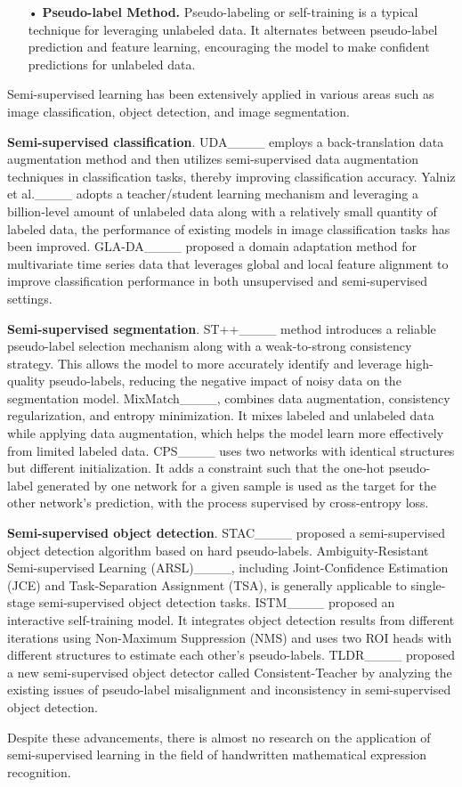 \begin{itemize}
    \item [•]
    \textbf{Pseudo-label Method.}
    Pseudo-labeling or self-training is a typical technique for leveraging unlabeled data. It alternates between pseudo-label prediction and feature learning, encouraging the model to make confident predictions for unlabeled data. 
\end{itemize}

Semi-supervised learning has been extensively applied in various areas such as image classification, object detection, and image segmentation.

\textbf{Semi-supervised classification}. 
UDA____ employs a back-translation data augmentation method and then utilizes semi-supervised data augmentation techniques in classification tasks, thereby improving classification accuracy. Yalniz et al.____ adopts a teacher/student learning mechanism and leveraging a billion-level amount of unlabeled data along with a relatively small quantity of labeled data, the performance of existing models in image classification tasks has been improved. GLA-DA____ proposed a domain adaptation method for multivariate time series data that leverages global and local feature alignment to improve classification performance in both unsupervised and semi-supervised settings. 

\textbf{Semi-supervised segmentation}.
ST++____ method introduces a reliable pseudo-label selection mechanism along with a weak-to-strong consistency strategy. This allows the model to more accurately identify and leverage high-quality pseudo-labels, reducing the negative impact of noisy data on the segmentation model. MixMatch____, combines data augmentation, consistency regularization, and entropy minimization. It mixes labeled and unlabeled data while applying data augmentation, which helps the model learn more effectively from limited labeled data.  CPS____ uses two networks with identical structures but different initialization. It adds a constraint such that the one-hot pseudo-label generated by one network for a given sample is used as the target for the other network's prediction, with the process supervised by cross-entropy loss. 

\textbf{Semi-supervised object detection}.
STAC____ proposed a semi-supervised object detection algorithm based on hard pseudo-labels. Ambiguity-Resistant Semi-supervised Learning (ARSL)____, including Joint-Confidence Estimation (JCE) and Task-Separation Assignment (TSA), is generally applicable to single-stage semi-supervised object detection tasks. ISTM____ proposed an interactive self-training model. It integrates object detection results from different iterations using Non-Maximum Suppression (NMS) and uses two ROI heads with different structures to estimate each other's pseudo-labels.  TLDR____ proposed a new semi-supervised object detector called Consistent-Teacher by analyzing the existing issues of pseudo-label misalignment and inconsistency in semi-supervised object detection. 

Despite these advancements, there is almost no research on the application of semi-supervised learning in the field of handwritten mathematical expression recognition.